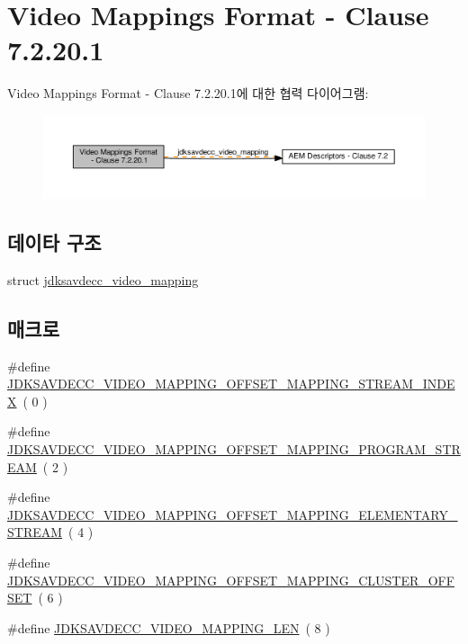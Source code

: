 \hypertarget{group__video__mapping}{}\section{Video Mappings Format -\/ Clause 7.2.20.1}
\label{group__video__mapping}
Video Mappings Format -\/ Clause 7.2.20.1에 대한 협력 다이어그램\+:
\nopagebreak
\begin{figure}[H]
\begin{center}
\leavevmode
\includegraphics[width=350pt]{group__video__mapping}
\end{center}
\end{figure}
\subsection*{데이타 구조}
\begin{DoxyCompactItemize}
\item 
struct \hyperlink{structjdksavdecc__video__mapping}{jdksavdecc\+\_\+video\+\_\+mapping}
\end{DoxyCompactItemize}
\subsection*{매크로}
\begin{DoxyCompactItemize}
\item 
\#define \hyperlink{group__video__mapping_ga8a438dda99ec8e3b7e5b6aea779b5f36}{J\+D\+K\+S\+A\+V\+D\+E\+C\+C\+\_\+\+V\+I\+D\+E\+O\+\_\+\+M\+A\+P\+P\+I\+N\+G\+\_\+\+O\+F\+F\+S\+E\+T\+\_\+\+M\+A\+P\+P\+I\+N\+G\+\_\+\+S\+T\+R\+E\+A\+M\+\_\+\+I\+N\+D\+EX}~( 0 )
\item 
\#define \hyperlink{group__video__mapping_ga2e9eb365a43f3e40e03438caa4c29dd4}{J\+D\+K\+S\+A\+V\+D\+E\+C\+C\+\_\+\+V\+I\+D\+E\+O\+\_\+\+M\+A\+P\+P\+I\+N\+G\+\_\+\+O\+F\+F\+S\+E\+T\+\_\+\+M\+A\+P\+P\+I\+N\+G\+\_\+\+P\+R\+O\+G\+R\+A\+M\+\_\+\+S\+T\+R\+E\+AM}~( 2 )
\item 
\#define \hyperlink{group__video__mapping_gabea225be2648027acc6ed7f8acf44944}{J\+D\+K\+S\+A\+V\+D\+E\+C\+C\+\_\+\+V\+I\+D\+E\+O\+\_\+\+M\+A\+P\+P\+I\+N\+G\+\_\+\+O\+F\+F\+S\+E\+T\+\_\+\+M\+A\+P\+P\+I\+N\+G\+\_\+\+E\+L\+E\+M\+E\+N\+T\+A\+R\+Y\+\_\+\+S\+T\+R\+E\+AM}~( 4 )
\item 
\#define \hyperlink{group__video__mapping_gaf8730c34ed728d0be2bd774fddea75d3}{J\+D\+K\+S\+A\+V\+D\+E\+C\+C\+\_\+\+V\+I\+D\+E\+O\+\_\+\+M\+A\+P\+P\+I\+N\+G\+\_\+\+O\+F\+F\+S\+E\+T\+\_\+\+M\+A\+P\+P\+I\+N\+G\+\_\+\+C\+L\+U\+S\+T\+E\+R\+\_\+\+O\+F\+F\+S\+ET}~( 6 )
\item 
\#define \hyperlink{group__video__mapping_gabf764135c5b516f8e5017b4060faef0f}{J\+D\+K\+S\+A\+V\+D\+E\+C\+C\+\_\+\+V\+I\+D\+E\+O\+\_\+\+M\+A\+P\+P\+I\+N\+G\+\_\+\+L\+EN}~( 8 )
\end{DoxyCompactItemize}
